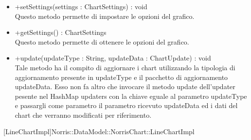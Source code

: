 \begin{itemize}
\begin{itemize}
					\item[\ding{111}] {{+setSettings(settings : ChartSettings) : void}} \\ [1mm] Questo metodo permette di impostare le opzioni del grafico.
					\item[\ding{111}] {{+getSettings() : ChartSettings}} \\ [1mm] Questo metodo permette di ottenere le opzioni del grafico.
					\item[\ding{111}] {{+update(updateType : String, updateData : ChartUpdate) : void}} \\ [1mm] Tale metodo ha il compito di aggiornare i chart utilizzando la tipologia di aggiornamento presente in updateType e il pacchetto di aggiornamento updateData. Esso non fa altro che invocare il metodo update dell’updater pesente nel HashMap updaters con la chiave eguale al parametro updateType e passargli come parametro il parametro ricevuto updateData ed i dati del chart che verranno modificati per riferimento.
				\end{itemize}
		
			\end{itemize}

			
			[LineChartImpl]{Norris::DataModel::NorrisChart::LineChartImpl}
			

	
